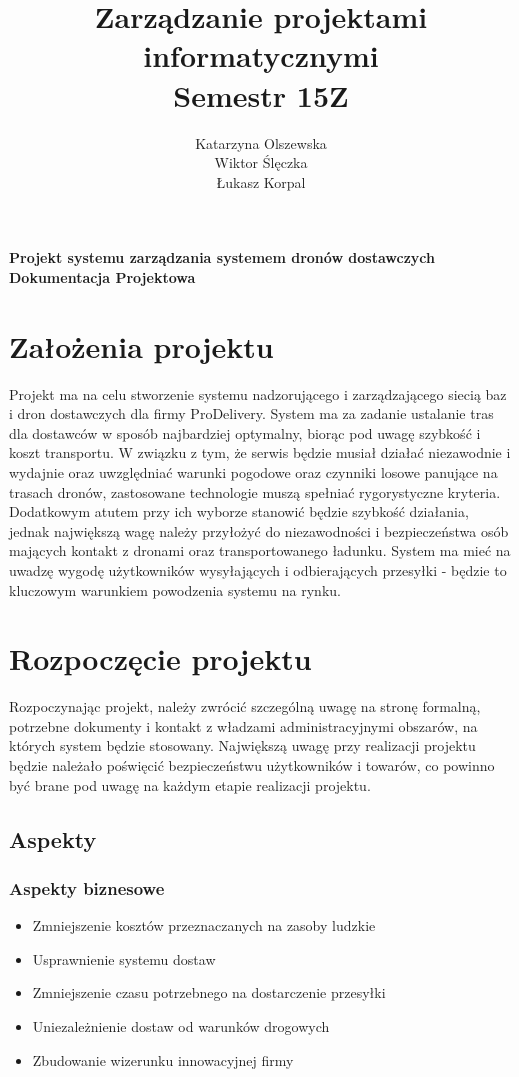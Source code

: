 \documentclass[12pt]{article}
\title{\textbf{Zarządzanie projektami informatycznymi \\ Semestr 15Z}}
\author{Katarzyna Olszewska\\
		Wiktor Ślęczka\\
		Łukasz Korpal}
\date{}
\begin{document}
\maketitle

\newpage
\large{\textbf{Projekt systemu zarządzania systemem dronów dostawczych\\
Dokumentacja Projektowa}}

\section{Założenia projektu}
Projekt ma na celu stworzenie systemu nadzorującego i zarządzającego siecią baz i dron dostawczych dla firmy ProDelivery.
System ma za zadanie ustalanie tras dla dostawców w sposób najbardziej optymalny, biorąc pod uwagę szybkość i koszt transportu.
W związku z tym, że serwis będzie musiał działać niezawodnie i wydajnie oraz uwzględniać warunki pogodowe oraz czynniki losowe panujące na trasach dronów, zastosowane technologie muszą spełniać rygorystyczne kryteria.
Dodatkowym atutem przy ich wyborze stanowić będzie szybkość działania, jednak największą wagę należy przyłożyć do niezawodności i bezpieczeństwa osób mających kontakt z dronami oraz transportowanego ładunku.
System ma mieć na uwadzę wygodę użytkowników wysyłających i odbierających przesyłki - będzie to kluczowym warunkiem powodzenia systemu na rynku.


\section{Rozpoczęcie projektu}
Rozpoczynając projekt, należy zwrócić szczególną uwagę na stronę formalną, potrzebne dokumenty i kontakt z władzami administracyjnymi obszarów, na których system będzie stosowany.
Największą uwagę przy realizacji projektu będzie należało poświęcić bezpieczeństwu użytkowników i towarów, co powinno być brane pod uwagę na każdym etapie realizacji projektu.
\subsection{Aspekty}
\subsubsection{Aspekty biznesowe}
\begin{itemize}
\item Zmniejszenie kosztów przeznaczanych na zasoby ludzkie
\item Usprawnienie systemu dostaw
\item Zmniejszenie czasu potrzebnego na dostarczenie przesyłki
\item Uniezależnienie dostaw od warunków drogowych
\item Zbudowanie wizerunku innowacyjnej firmy
\end{itemize}
\end{document}
